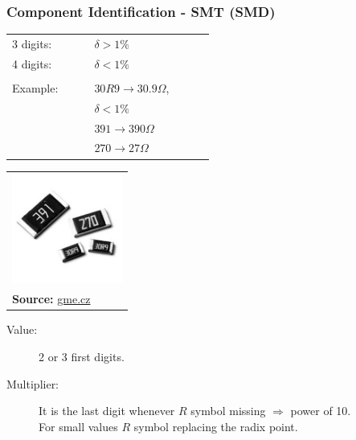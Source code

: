 \documentclass{beamer}
\begin{document}
	\begin{frame}
    \frametitle{Component Identification - SMT (SMD)}
		\begin{center}
		\begin{tabular}{p{0.2\linewidth} p{0.3\linewidth}}
				3 digits:& $\delta> 1\%$\\
				4 digits:& $\delta< 1\%$\\\\
				Example: & $30R9\rightarrow 30.9 \Omega$, \\
								 & $\delta< 1\%$\\
								 & $391\rightarrow 390 \Omega$\\
								 & $270\rightarrow 27 \Omega$\\
		\end{tabular}
		\begin{tabular}{p{0.3\linewidth}}
			\includegraphics[scale=0.35]{obr05_smdZn.png}\\
			\tiny{\textbf{Source: }\url{gme.cz}}\\
		\end{tabular}
		
		\begin{description}
		\item[Value:] 2 or 3 first digits.
		\item[Multiplier:] It is the last digit whenever $R$ symbol missing $\Rightarrow$ power of 10.\\
											 For small values $R$ symbol replacing the radix point.
		\end{description}

		\end{center}
  \end{frame}
\end{document}
